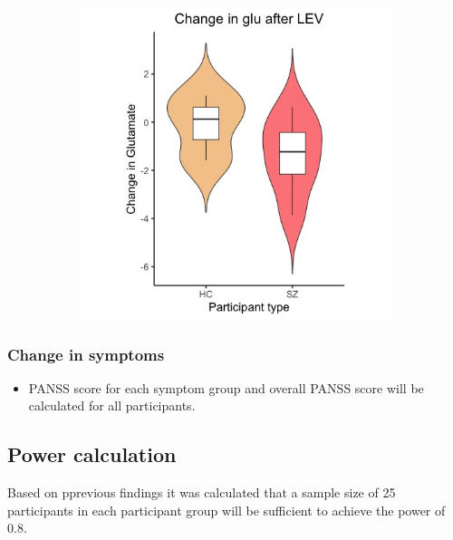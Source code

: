 \documentclass[
  letterpaper,
  DIV=11,
  numbers=noendperiod]{scrartcl}
\providecommand{\tightlist}{%
  \setlength{\itemsep}{0pt}\setlength{\parskip}{0pt}}\usepackage{longtable,booktabs,array}
\begin{document}
\begin{figure}
\begin{minipage}{0.50\linewidth}
\begin{figure}[H]
{\centering \includegraphics{files/acc_violin_plot.jpeg}

}


\end{figure}%

\end{minipage}%

\end{figure}%

\subsubsection{Change in symptoms}\label{change-in-symptoms}

\begin{itemize}
\tightlist
\item
  PANSS score for each symptom group and overall PANSS score will be
  calculated for all participants.
\end{itemize}

\subsection{Power calculation}\label{power-calculation}

Based on pprevious findings it was calculated that a sample size of 25
participants in each participant group will be sufficient to achieve the
power of 0.8.
\end{document}

